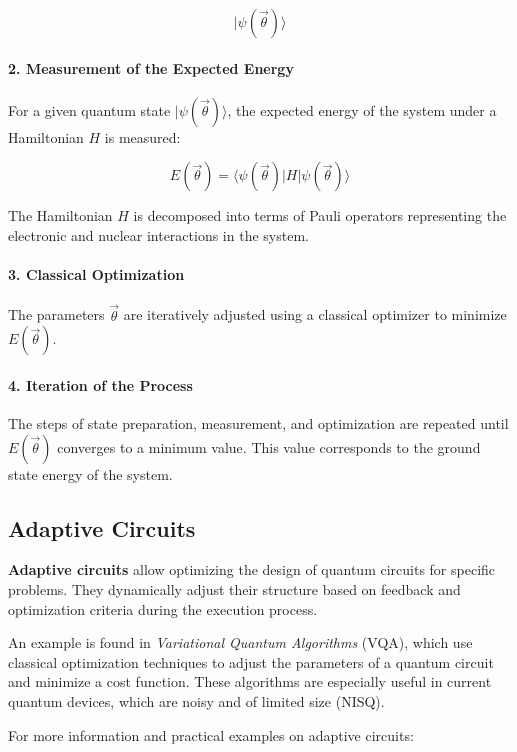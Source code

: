 \[
|\psi(\vec{\theta})\rangle
\]

\paragraph{2. Measurement of the Expected Energy}

For a given quantum state \(|\psi(\vec{\theta})\rangle\), the expected energy of the system under a Hamiltonian \(H\) is measured:

\[
E(\vec{\theta}) = \langle \psi(\vec{\theta}) | H | \psi(\vec{\theta}) \rangle
\]

The Hamiltonian \(H\) is decomposed into terms of Pauli operators representing the electronic and nuclear interactions in the system.

\paragraph{3. Classical Optimization}

The parameters \(\vec{\theta}\) are iteratively adjusted using a classical optimizer to minimize \(E(\vec{\theta})\).

\paragraph{4. Iteration of the Process}

The steps of state preparation, measurement, and optimization are repeated until \(E(\vec{\theta})\) converges to a minimum value. This value corresponds to the ground state energy of the system.

\subsection{Adaptive Circuits}

\textbf{Adaptive circuits} allow optimizing the design of quantum circuits for specific problems. They dynamically adjust their structure based on feedback and optimization criteria during the execution process.

An example is found in \textit{Variational Quantum Algorithms} (VQA), which use classical optimization techniques to adjust the parameters of a quantum circuit and minimize a cost function. These algorithms are especially useful in current quantum devices, which are noisy and of limited size (NISQ).

For more information and practical examples on adaptive circuits:

